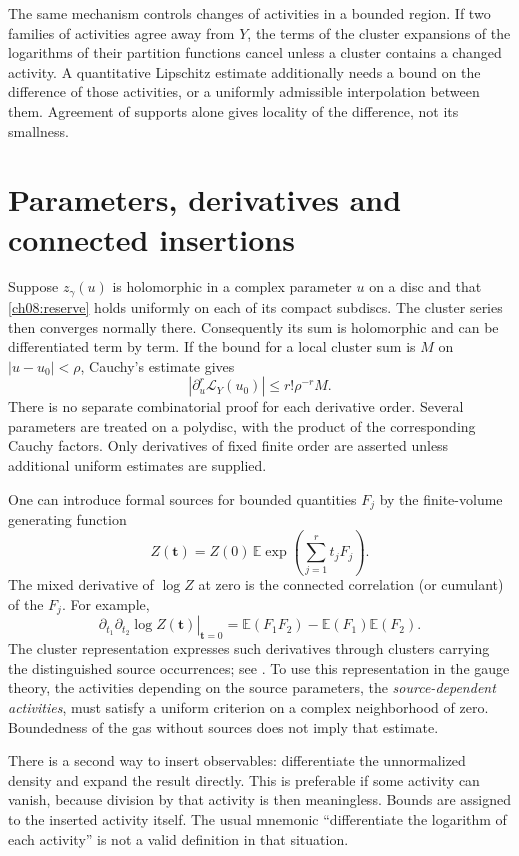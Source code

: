 The same mechanism controls changes of activities in a bounded region.
If two families of activities agree away from $Y$, the terms of the cluster
expansions of the logarithms of their partition functions cancel unless a cluster contains a changed activity.
A quantitative Lipschitz estimate additionally needs a bound on the
difference of those activities, or a uniformly admissible interpolation
between them. Agreement of supports alone gives locality of the
difference, not its smallness.

\section{Parameters, derivatives and connected insertions}
\label{ch08:parameters}

Suppose $z_\gamma(u)$ is holomorphic in a complex parameter $u$ on a
disc and that \eqref{ch08:reserve} holds uniformly on each of its compact
subdiscs. The cluster series then converges normally there. Consequently
its sum is holomorphic and can be differentiated term by term. If the
bound for a local cluster sum is $M$ on $|u-u_0|<\rho$, Cauchy's estimate
gives
\begin{equation}\label{ch08:cauchy}
 |\partial_u^r\mathcal L_Y(u_0)|\le r!\rho^{-r}M.
\end{equation}
There is no separate combinatorial proof for each derivative order.
Several parameters are treated on a polydisc, with the product of the
corresponding Cauchy factors. Only derivatives of fixed finite order are
asserted unless additional uniform estimates are supplied.

One can introduce formal sources for bounded quantities $F_j$ by the
finite-volume generating function
\[
 Z(\boldsymbol t)=Z(0)\,
       \mathbb E\exp\!\left(\sum_{j=1}^r t_jF_j\right).
\]
The mixed derivative of $\log Z$ at zero is the connected correlation
(or cumulant) of the $F_j$. For example,
\[
 \left.\partial_{t_1}\partial_{t_2}\log Z(\boldsymbol t)
 \right|_{\boldsymbol t=0}
 =\mathbb E(F_1F_2)-\mathbb E(F_1)\mathbb E(F_2).
\]
The cluster representation expresses such derivatives through clusters
carrying the distinguished source occurrences; see
\cite[\S3]{Ueltschi2004}. To use this representation in the gauge theory,
the activities depending on the source parameters, the \emph{source-dependent activities}, must satisfy a uniform criterion on a
complex neighborhood of zero. Boundedness of the gas without sources
does not imply that estimate.

There is a second way to insert observables: differentiate the unnormalized
density and expand the result directly. This is preferable if some activity
can vanish, because division by that activity is then meaningless.
Bounds are assigned to the inserted activity itself. The usual mnemonic
``differentiate the logarithm of each activity'' is not a valid definition
in that situation.

